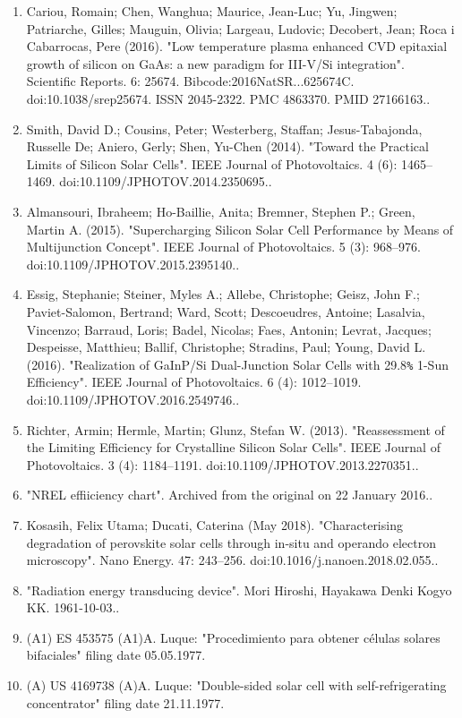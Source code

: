 \begin{enumerate}
\item Cariou, Romain; Chen, Wanghua; Maurice, Jean-Luc; Yu, Jingwen; Patriarche, Gilles; Mauguin, Olivia; Largeau, Ludovic; Decobert, Jean; Roca i Cabarrocas, Pere (2016). "Low temperature plasma enhanced CVD epitaxial growth of silicon on GaAs: a new paradigm for III-V/Si integration". Scientific Reports. 6: 25674. Bibcode:2016NatSR...625674C. doi:10.1038/srep25674. ISSN 2045-2322. PMC 4863370. PMID 27166163..
\item Smith, David D.; Cousins, Peter; Westerberg, Staffan; Jesus-Tabajonda, Russelle De; Aniero, Gerly; Shen, Yu-Chen (2014). "Toward the Practical Limits of Silicon Solar Cells". IEEE Journal of Photovoltaics. 4 (6): 1465–1469. doi:10.1109/JPHOTOV.2014.2350695..
\item Almansouri, Ibraheem; Ho-Baillie, Anita; Bremner, Stephen P.; Green, Martin A. (2015). "Supercharging Silicon Solar Cell Performance by Means of Multijunction Concept". IEEE Journal of Photovoltaics. 5 (3): 968–976. doi:10.1109/JPHOTOV.2015.2395140..
\item Essig, Stephanie; Steiner, Myles A.; Allebe, Christophe; Geisz, John F.; Paviet-Salomon, Bertrand; Ward, Scott; Descoeudres, Antoine; Lasalvia, Vincenzo; Barraud, Loris; Badel, Nicolas; Faes, Antonin; Levrat, Jacques; Despeisse, Matthieu; Ballif, Christophe; Stradins, Paul; Young, David L. (2016). "Realization of GaInP/Si Dual-Junction Solar Cells with 29.8\verb`%` 1-Sun Efficiency". IEEE Journal of Photovoltaics. 6 (4): 1012–1019. doi:10.1109/JPHOTOV.2016.2549746..
\item Richter, Armin; Hermle, Martin; Glunz, Stefan W. (2013). "Reassessment of the Limiting Efficiency for Crystalline Silicon Solar Cells". IEEE Journal of Photovoltaics. 3 (4): 1184–1191. doi:10.1109/JPHOTOV.2013.2270351..
\item "NREL effiiciency chart". Archived from the original on 22 January 2016..
\item Kosasih, Felix Utama; Ducati, Caterina (May 2018). "Characterising degradation of perovskite solar cells through in-situ and operando electron microscopy". Nano Energy. 47: 243–256. doi:10.1016/j.nanoen.2018.02.055..
\item "Radiation energy transducing device". Mori Hiroshi, Hayakawa Denki Kogyo KK. 1961-10-03..
\item (A1) ES 453575 (A1)A. Luque: "Procedimiento para obtener células solares bifaciales" filing date 05.05.1977.
\item (A) US 4169738 (A)A. Luque: "Double-sided solar cell with self-refrigerating concentrator" filing date 21.11.1977.

\end{enumerate}
